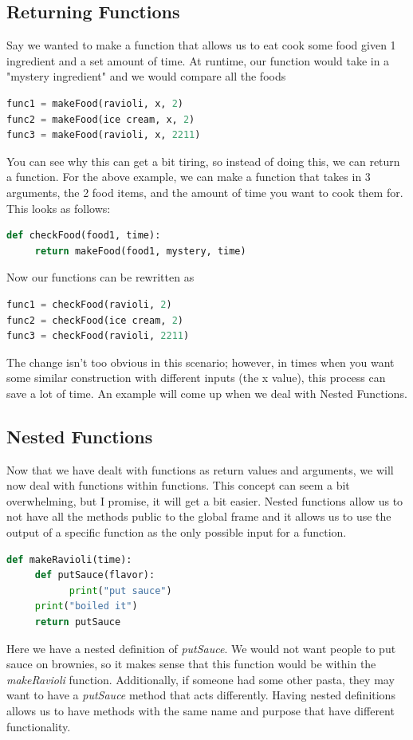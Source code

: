 \documentclass{article}
\begin{document}
\subsection{Returning Functions}
Say we wanted to make a function that allows us to eat cook some food given 1 ingredient and a set amount of time. At runtime, our function would take in a "mystery ingredient" and we would compare all the foods 
\begin{lstlisting}[language = Python]
func1 = makeFood(ravioli, x, 2)
func2 = makeFood(ice cream, x, 2)
func3 = makeFood(ravioli, x, 2211)
\end{lstlisting}
You can see why this can get a bit tiring, so instead of doing this, we can return a function. For the above example, we can make a function that takes in 3 arguments, the 2 food items, and the amount of time you want to cook them for. This looks as follows: 
\begin{lstlisting}[language = Python]
def checkFood(food1, time):
     return makeFood(food1, mystery, time)
\end{lstlisting}
Now our functions can be rewritten as 
\begin{lstlisting}[language = Python]
func1 = checkFood(ravioli, 2)
func2 = checkFood(ice cream, 2)
func3 = checkFood(ravioli, 2211)
\end{lstlisting}
The change isn't too obvious in this scenario; however, in times when you want some similar construction with different inputs (the x value), this process can save a lot of time. An example will come up when we deal with Nested Functions.
\subsection{Nested Functions}
Now that we have dealt with functions as return values and arguments, we will now deal with functions within functions. This concept can seem a bit overwhelming, but I promise, it will get a bit easier. Nested functions allow us to not have all the methods public to the global frame and it allows us to use the output of a specific function as the only possible input for a function. 
\begin{lstlisting}[language = Python]
def makeRavioli(time):
     def putSauce(flavor):
           print("put sauce")
     print("boiled it")
     return putSauce
\end{lstlisting}
Here we have a nested definition of \emph{putSauce}. We would not want people to put sauce on brownies, so it makes sense that this function would be within the \emph{makeRavioli} function. Additionally, if someone had some other pasta, they may want to have a \emph{putSauce} method that acts differently. Having nested definitions allows us to have methods with the same name and purpose that have different functionality.
\end{document}
